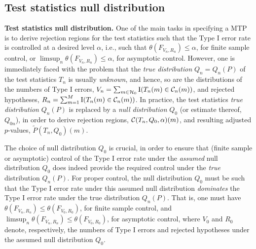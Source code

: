 \documentclass[11pt]{article}
\begin{document}
\subsection{Test statistics null distribution}
\label{anal:mult:s:nullDistn}

\noindent
{\bf Test statistics null distribution.}
One of the main tasks in specifying a MTP is to derive rejection regions for the test statistics such that the Type I error rate is controlled at a desired level $\alpha$, i.e., such that $\theta(F_{V_n,R_n}) \leq \alpha$, for finite sample control, or $\limsup_n \theta(F_{V_n,R_n}) \leq \alpha$, for asymptotic control.
However, one is immediately faced with the problem that the {\em true distribution} $Q_n=Q_n(P)$ of the test statistics $T_n$ is usually {\em unknown}, and hence, so are the distributions of the numbers of Type I errors, $V_n = \sum_{m \in {\cal H}_0} \mathrm{I}(T_n(m) \in {\cal C}_n(m))$, and rejected hypotheses, $R_n = \sum_{m=1}^M  \mathrm{I}(T_n(m) \in {\cal C}_n(m))$. 
In practice, the test statistics {\em true distribution} $Q_n(P)$ is replaced by a {\em null distribution} $Q_0$ (or estimate thereof, $Q_{0n}$), in order to derive rejection regions, ${\cal C}(T_n,Q_0,\alpha)(m)$, and resulting adjusted $p$-values, $\widetilde{P}(T_n,Q_0)(m)$. 

The choice of null distribution $Q_0$ is crucial, in order
to ensure that (finite sample or asymptotic) control of the Type I
error rate under the {\em assumed} null distribution $Q_0$ does indeed provide the required control under the {\em true} distribution $Q_n(P)$.
For proper control, the null distribution $Q_0$ must be such that the Type I error rate under this assumed null distribution {\em dominates} the Type I error rate under the true distribution $Q_n(P)$. That is, one must have $\theta(F_{V_n,R_n}) \leq \theta(F_{V_0,R_0})$, for finite sample control, and $\limsup_n \theta(F_{V_n,R_n}) \leq  \theta(F_{V_0,R_0})$, for asymptotic control, where $V_0$ and $R_0$ denote, respectively, the numbers of Type I errors and rejected hypotheses under the assumed null distribution $Q_0$.  
\end{document}
